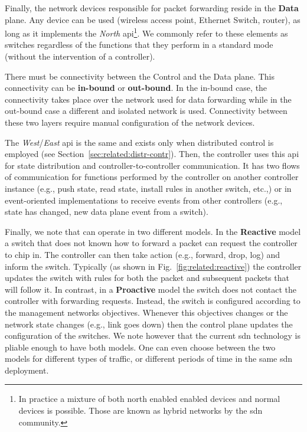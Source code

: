 Finally, the network devices responsible for packet forwarding reside in the  \textbf{Data} plane. 
Any device can be used (wireless access point, Ethernet Switch, router), as long as it implements the \emph{North} \gls{api}\footnote{In practice a mixture of both north enabled  enabled devices and normal devices is possible. Those are known as hybrid networks by the \gls{sdn} community.}.
We commonly refer to these elements as switches regardless  of the functions that they perform in a standard mode (without the intervention of a controller). 

There must be connectivity between the Control and the Data plane.
This connectivity can be  \textbf{in-bound} or \textbf{out-bound}. 
In the in-bound case, the connectivity takes place over the network used for data forwarding while in the out-bound case a different and isolated network is used. 
Connectivity between these two layers require manual configuration of the network devices. 

The \emph{West}/\emph{East}  \gls{api} is  the same and exists only when  distributed control is employed (see Section~\ref{sec:related:distr-contr}). 
Then, the controller uses this \gls{api}  for state distribution and controller-to-controller communication. 
It has two flows of communication for functions performed by the controller on another controller instance (e.g., push state, read state, install rules in another switch, etc.,) or in event-oriented  implementations to receive events from other controllers (e.g., state has changed, new data plane event from a switch). 

Finally, we note that  can operate in two different models. 
In the  \textbf{Reactive} model a switch that does not known how to forward a packet can request the controller to chip in. 
The controller can then take action (e.g., forward, drop, log)  and inform the switch. 
Typically (as shown in Fig.~\ref{fig:related:reactive}) the controller updates the switch with rules for both the packet and subsequent packets that will follow it.  
In contrast, in a \textbf{Proactive} model the switch does not contact the controller with  forwarding requests. 
Instead, the switch is configured according to the management networks objectives. 
Whenever this objectives changes or the network state changes (e.g., link goes down) then the control plane updates the configuration of the switches. 
We note however that the current \gls{sdn} technology is pliable enough to have both models. 
One can even choose between the two models for different types of traffic, or different periods of time in the same \gls{sdn} deployment. 

